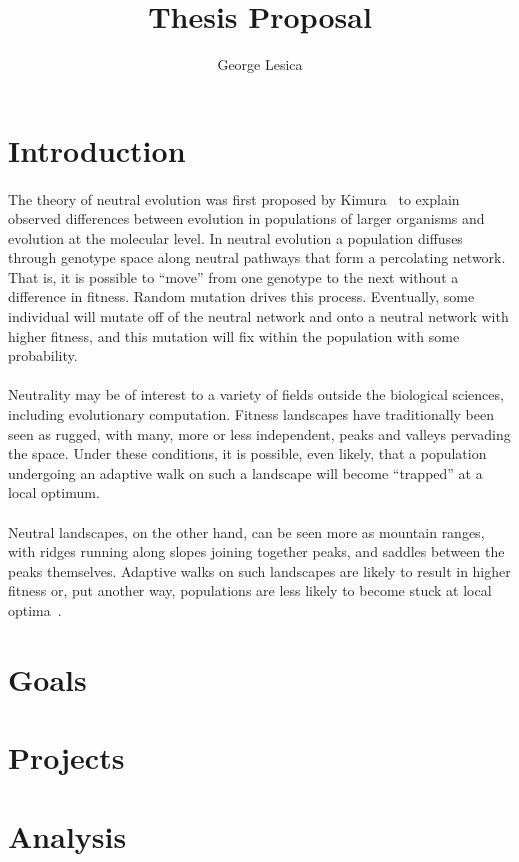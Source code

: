 \documentclass[12pt,letterpaper,titlepage,draft]{article}
\author{George Lesica}
\title{Thesis Proposal}
\begin{document}
\maketitle

\section{Introduction}

\paragraph{}
The theory of neutral evolution was first proposed by Kimura~\cite{Kimura1984}
to explain observed differences between evolution in populations of larger
organisms and evolution at the molecular level. In neutral evolution a
population diffuses through genotype space along neutral pathways that form a
percolating network. That is, it is possible to ``move'' from one genotype to
the next without a difference in fitness. Random mutation drives this process.
Eventually, some individual will mutate off of the neutral network and onto a
neutral network with higher fitness, and this mutation will fix within the
population with some probability.

\paragraph{}
Neutrality may be of interest to a variety of fields outside the biological
sciences, including evolutionary computation. Fitness landscapes have
traditionally been seen as rugged, with many, more or less independent, peaks
and valleys pervading the space. Under these conditions, it is possible, even
likely, that a population undergoing an adaptive walk on such a landscape will
become ``trapped'' at a local optimum.

\paragraph{}
Neutral landscapes, on the other hand, can be seen more as mountain ranges,
with ridges running along slopes joining together peaks, and saddles between
the peaks themselves. Adaptive walks on such landscapes are likely to result in
higher fitness or, put another way, populations are less likely to become stuck
at local optima~\cite{Newman1998}.

\section{Goals}

\section{Projects}

\section{Analysis}

{}

\end{document}
